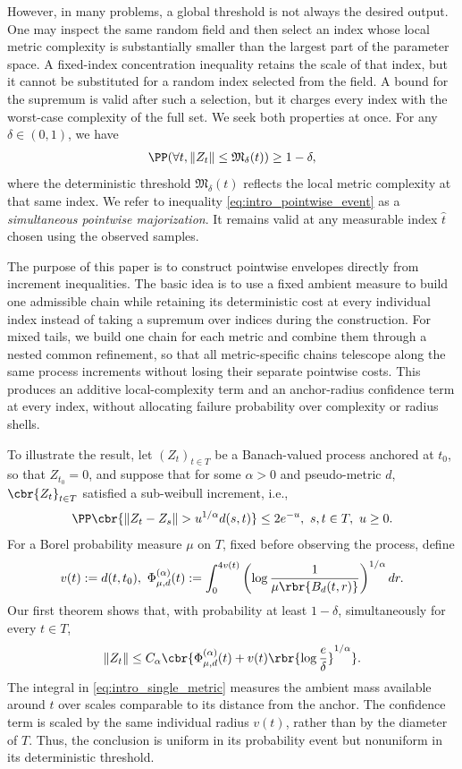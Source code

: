 \documentclass[11pt]{article}
\begin{document}
However, in many problems, a global threshold is not always the
desired output.  One may inspect the same random field and then select an
index whose local metric complexity is substantially smaller than the largest
part of the parameter space.  A fixed-index concentration inequality retains
the scale of that index, but it cannot be substituted for a random index selected from the field.  A bound for the supremum is valid after such a
selection, but it charges every index with the worst-case complexity of the full set.
We seek both properties at once. For any $\delta\in(0,1)$, we have 
\begin{align}
\PP(\forall t, \|Z_t\|\le \mathfrak M_\delta(t))\ge 1-\delta,
\label{eq:intro_pointwise_event}
\end{align}
where the deterministic threshold $\mathfrak M_\delta(t)$ reflects the local
metric complexity at that same index.  We refer to inequality \eqref{eq:intro_pointwise_event} as a \emph{simultaneous pointwise
majorization}.  It remains valid at any measurable index $\widehat t$ chosen
using the observed samples.

The purpose of this paper is to construct pointwise envelopes directly
from increment inequalities.  The basic idea is to use a fixed ambient
measure to build one admissible chain while retaining its deterministic cost
at every individual index instead of taking a supremum over indices during
the construction.  For mixed tails, we build one chain for each metric and
combine them through a nested common refinement, so that all metric-specific chains
telescope along the same process increments without losing their separate
pointwise costs.  This produces an additive local-complexity term and an
anchor-radius confidence term at every index, without allocating failure
probability over complexity or radius shells.

To illustrate the result, let $(Z_t)_{t\in T}$ be a Banach-valued process
anchored at $t_0$, so that $Z_{t_0}=0$, and suppose that for some
$\alpha>0$ and pseudo-metric $d$, $\cbr{Z_t}_{t\in T}$ satisfied a sub-weibull increment, i.e., 
\begin{align*}
\PP\cbr{
\|Z_t-Z_s\|>u^{1/\alpha}d(s,t)
}
\le 2e^{-u},
\ s,t\in T,\ u\ge0.
\end{align*}
For a Borel probability measure $\mu$ on $T$, fixed before observing the
process, define
\begin{align*}
v(t):=d(t,t_0),\ 
\Phi_{\mu,d}^{(\alpha)}(t):=
\int_0^{4v(t)}
\left(
\log\frac{1}{\mu\rbr{B_d(t,r)}}
\right)^{1/\alpha}dr.
\end{align*}
Our first theorem shows that, with probability at least $1-\delta$,
simultaneously for every $t\in T$,
\begin{align}
\|Z_t\|
\le
C_\alpha\cbr{
\Phi_{\mu,d}^{(\alpha)}(t)
+v(t)\rbr{\log\frac{e}{\delta}}^{1/\alpha}
}.
\label{eq:intro_single_metric}
\end{align}
The integral in \eqref{eq:intro_single_metric} measures the ambient mass
available around $t$ over scales comparable to its distance from the
anchor.  The confidence term is scaled by the same individual radius
$v(t)$, rather than by the diameter of $T$. Thus, the conclusion is uniform
in its probability event but nonuniform in its deterministic threshold.
\end{document}

